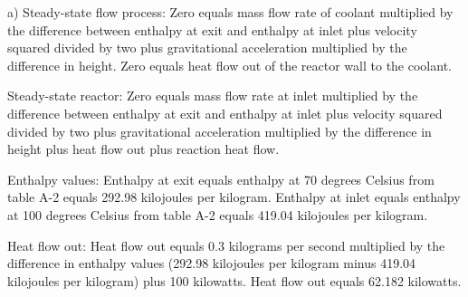 a) Steady-state flow process:  
Zero equals mass flow rate of coolant multiplied by the difference between enthalpy at exit and enthalpy at inlet plus velocity squared divided by two plus gravitational acceleration multiplied by the difference in height.  
Zero equals heat flow out of the reactor wall to the coolant.  

Steady-state reactor:  
Zero equals mass flow rate at inlet multiplied by the difference between enthalpy at exit and enthalpy at inlet plus velocity squared divided by two plus gravitational acceleration multiplied by the difference in height plus heat flow out plus reaction heat flow.  

Enthalpy values:  
Enthalpy at exit equals enthalpy at 70 degrees Celsius from table A-2 equals 292.98 kilojoules per kilogram.  
Enthalpy at inlet equals enthalpy at 100 degrees Celsius from table A-2 equals 419.04 kilojoules per kilogram.  

Heat flow out:  
Heat flow out equals 0.3 kilograms per second multiplied by the difference in enthalpy values (292.98 kilojoules per kilogram minus 419.04 kilojoules per kilogram) plus 100 kilowatts.  
Heat flow out equals 62.182 kilowatts.